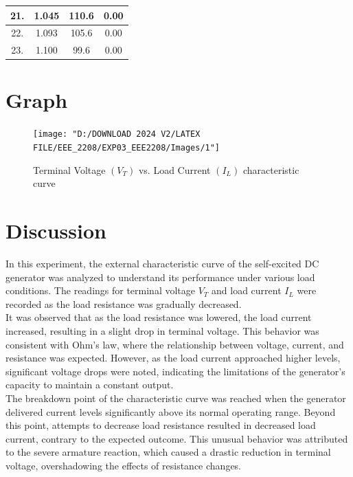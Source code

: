 \documentclass[a4paper,12pt]{article}
\begin{document}
\begin{table}[H]
{\begin{tabular}{|c|c|c|c|}
		21.                                                       & 1.045                                                                 & 110.6                                                                     & 0.00                                                                   \\ \hline
		22.                                                       & 1.093                                                                 & 105.6                                                                     & 0.00                                                                   \\ \hline
		23.& 1.100                                                                 & 99.6                                                                      & 0.00                                                                   \\ \hline
	\end{tabular}
}
\end{table}	
\section{Graph}
\begin{figure}[H]
	\centering
	\texttt{[image: "D:/DOWNLOAD 2024 V2/LATEX FILE/EEE\_2208/EXP03\_EEE2208/Images/1"]}
	\caption{Terminal Voltage $(V_T)$ vs. Load Current $(I_L)$ characteristic curve}
	\label{fig:1}
\end{figure}
\section{Discussion}



In this experiment, the external characteristic curve of the self-excited DC generator was analyzed to understand its performance under various load conditions. The readings for terminal voltage \( V_T \) and load current \( I_L \) were recorded as the load resistance was gradually decreased.\\
It was observed that as the load resistance was lowered, the load current increased, resulting in a slight drop in terminal voltage. This behavior was consistent with Ohm's law, where the relationship between voltage, current, and resistance was expected. However, as the load current approached higher levels, significant voltage drops were noted, indicating the limitations of the generator's capacity to maintain a constant output.\\
The breakdown point of the characteristic curve was reached when the generator delivered current levels significantly above its normal operating range. Beyond this point, attempts to decrease load resistance resulted in decreased load current, contrary to the expected outcome. This unusual behavior was attributed to the severe armature reaction, which caused a drastic reduction in terminal voltage, overshadowing the effects of resistance changes.
\end{document}
